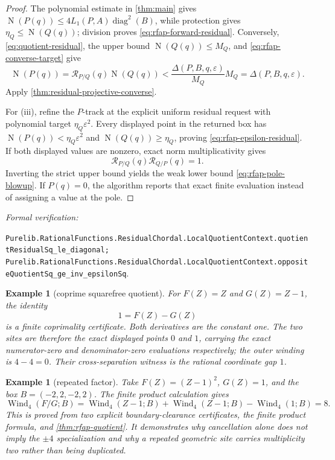 \documentclass[11pt]{article}
\newtheorem{example}[theorem]{Example}
\newcommand{\Norm}[1]{\operatorname{N}\!\left(#1\right)}
\newcommand{\Wind}{\operatorname{Wind}}
\newcommand{\diamq}{\operatorname{diag}^{2}}
\newcommand{\eps}{\varepsilon}
\newcommand{\leanref}[1]{\par\smallskip\noindent
  \emph{Formal verification:}\par\nobreak
  {\raggedright\nolinkurl{#1}.\par}}
\begin{document}
\begin{proof}
The polynomial estimate in \cref{thm:main} gives
$\Norm{P(q)}\le4L_1(P,A)\diamq(B)$, while protection gives
$\eta_Q\le\Norm{Q(q)}$; division proves
\eqref{eq:rfap-forward-residual}.  Conversely,
\eqref{eq:quotient-residual}, the upper bound $\Norm{Q(q)}\le M_Q$, and
\eqref{eq:rfap-converse-target} give
\[
 \Norm{P(q)}
 =\mathcal R_{P/Q}(q)\Norm{Q(q)}
 <\frac{\Delta(P,B,q,\eps)}{M_Q}M_Q
 =\Delta(P,B,q,\eps).
\]
Apply \cref{thm:residual-projective-converse}.

For (iii), refine the $P$-track at the explicit uniform residual request with
polynomial target $\eta_Q\eps^2$.  Every displayed point in the returned box
has $\Norm{P(q)}<\eta_Q\eps^2$ and
$\Norm{Q(q)}\ge\eta_Q$, proving
\eqref{eq:rfap-epsilon-residual}.  If both displayed values are nonzero,
exact norm multiplicativity gives
\[
 \mathcal R_{P/Q}(q)\mathcal R_{Q/P}(q)=1.
\]
Inverting the strict upper bound yields the weak lower bound
\eqref{eq:rfap-pole-blowup}.  If $P(q)=0$, the algorithm reports that exact
finite evaluation instead of assigning a value at the pole.
\end{proof}

\leanref{Purelib.RationalFunctions.ResidualChordal.LocalQuotientContext.quotientResidualSq_le_diagonal;
Purelib.RationalFunctions.ResidualChordal.LocalQuotientContext.oppositeQuotientSq_ge_inv_epsilonSq}

\begin{example}[coprime squarefree quotient]
For $F(Z)=Z$ and $G(Z)=Z-1$, the identity
\[
             1=F(Z)-G(Z)
\]
is a finite coprimality certificate.  Both derivatives are the constant one.
The two sites are therefore the exact displayed points $0$ and $1$, carrying
the exact numerator-zero and denominator-zero evaluations respectively; the
outer winding is $4-4=0$.  Their cross-separation witness is the rational
coordinate gap $1$.
\end{example}

\begin{example}[repeated factor]
Take $F(Z)=(Z-1)^2$, $G(Z)=1$, and the box
$B=(-2,2,-2,2)$.  The finite product calculation gives
\[
       \Wind_4(F/G;B)
       =\Wind_4(Z-1;B)+\Wind_4(Z-1;B)-\Wind_4(1;B)=8.
\]
This is proved from two explicit boundary-clearance certificates, the finite
product formula, and \cref{thm:rfap-quotient}.  It demonstrates why
cancellation alone does not imply the $\pm4$ specialization and why a
repeated geometric site carries multiplicity two rather than being duplicated.
\end{example}
\end{document}
